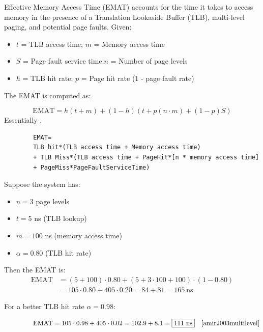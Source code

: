 \begin{Def}

    Effective Memory Access Time (EMAT) accounts for the time it takes to access memory in the presence of a Translation Lookaside Buffer (TLB), multi-level paging, and potential page faults.
    Given:
    \begin{itemize}
        \item $t$ = TLB access time;\hspace{3.4em} $m$ = Memory access time
        \item $S$ = Page fault service time;\quad $n$ = Number of page levels
        \item $h$ = TLB hit rate;\hspace{5.1em} $p$ = Page hit rate (1 - page fault rate)
    \end{itemize}

    The EMAT is computed as:

    \[
    \text{EMAT} =
    h(t + m) +
    (1 - h)\left(t + p(n \cdot m) + (1 - p)S\right)
    \]
    \noindent
    Essentially \cite{69017},
    \begin{lstlisting}
        EMAT=
        TLB hit*(TLB access time + Memory access time)
        + TLB Miss*(TLB access time + PageHit*[n * memory access time]
        + PageMiss*PageFaultServiceTime)
    \end{lstlisting}
\end{Def}
\begin{Example}

    Suppose the system has:
    \begin{itemize}
        \item $n = 3$ page levels
        \item $t = 5$ ns (TLB lookup)
        \item $m = 100$ ns (memory access time)
        \item $\alpha = 0.80$ (TLB hit rate)
    \end{itemize}

    \noindent
    Then the EMAT is:
    \begin{align*}
    \text{EMAT} &=
    (5 + 100)\cdot 0.80 +
    (5 + 3 \cdot 100 + 100)\cdot (1 - 0.80)\\
    &= 105 \cdot 0.80 + 405 \cdot 0.20 = 84 + 81 = \boxed{165\ \text{ns}}
    \end{align*}

    \noindent
    For a better TLB hit rate $\alpha = 0.98$:
    
    \vspace{-1em}
    \begin{align*}
        \hspace{4.3em}\text{EMAT} =
        105 \cdot 0.98 + 405 \cdot 0.02 = 102.9 + 8.1 = \boxed{111\ \text{ns}}  && \cite{amir2003multilevel}
    \end{align*}
\end{Example}

